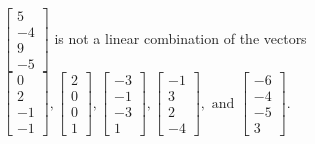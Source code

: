 \begin{exercise}
\begin{exerciseStatement}
  \end{exerciseStatement}
  \begin{exerciseAnswer}
   \(\left[\begin{array}{c}
5 \\
-4 \\
9 \\
-5
\end{array}\right]\) 
  	 is not  
	a linear combination of the vectors \(\left[\begin{array}{c}
0 \\
2 \\
-1 \\
-1
\end{array}\right] , \left[\begin{array}{c}
2 \\
0 \\
0 \\
1
\end{array}\right] , \left[\begin{array}{c}
-3 \\
-1 \\
-3 \\
1
\end{array}\right] , \left[\begin{array}{c}
-1 \\
3 \\
2 \\
-4
\end{array}\right] , \text{ and } \left[\begin{array}{c}
-6 \\
-4 \\
-5 \\
3
\end{array}\right]\).

	
  


  \end{exerciseAnswer}
\end{exercise}